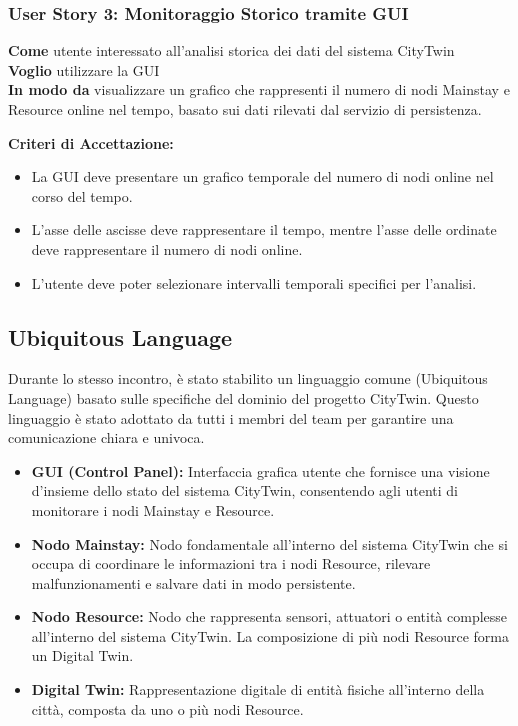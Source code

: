 \subsubsection{User Story 3: Monitoraggio Storico tramite GUI}

\textbf{Come} utente interessato all'analisi storica dei dati del sistema CityTwin \\
\textbf{Voglio} utilizzare la GUI \\
\textbf{In modo da} visualizzare un grafico che rappresenti il numero di nodi Mainstay e Resource online nel tempo, basato sui dati rilevati dal servizio di persistenza.

\textbf{Criteri di Accettazione:}
\begin{itemize}
  \item La GUI deve presentare un grafico temporale del numero di nodi online nel corso del tempo.
  \item L'asse delle ascisse deve rappresentare il tempo, mentre l'asse delle ordinate deve rappresentare il numero di nodi online.
  \item L'utente deve poter selezionare intervalli temporali specifici per l'analisi.
\end{itemize}

\subsection{Ubiquitous Language}

Durante lo stesso incontro, è stato stabilito un linguaggio comune (Ubiquitous Language) basato sulle specifiche del dominio del progetto CityTwin. Questo linguaggio è stato adottato da tutti i membri del team per garantire una comunicazione chiara e univoca.

\begin{itemize}
    \item \textbf{GUI (Control Panel):} Interfaccia grafica utente che fornisce una visione d'insieme dello stato del sistema CityTwin, consentendo agli utenti di monitorare i nodi Mainstay e Resource.
  
    \item \textbf{Nodo Mainstay:} Nodo fondamentale all'interno del sistema CityTwin che si occupa di coordinare le informazioni tra i nodi Resource, rilevare malfunzionamenti e salvare dati in modo persistente.
  
    \item \textbf{Nodo Resource:} Nodo che rappresenta sensori, attuatori o entità complesse all'interno del sistema CityTwin. La composizione di più nodi Resource forma un Digital Twin.
  
    \item \textbf{Digital Twin:} Rappresentazione digitale di entità fisiche all'interno della città, composta da uno o più nodi Resource.
  
  \end{itemize}

